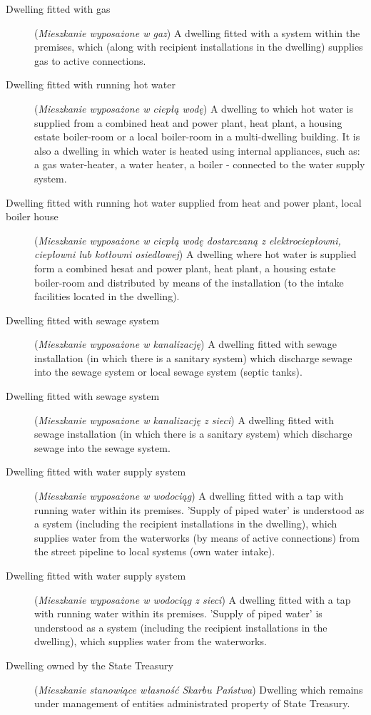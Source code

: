 \documentclass[12pt,a4paper]{article}
\begin{document}
\begin{description}
\item[Dwelling fitted with gas] (\textit{Mieszkanie wyposażone w gaz}) A dwelling fitted with a system within the premises, which (along with recipient installations in the dwelling) supplies gas to active connections.
\item[Dwelling fitted with running hot water] (\textit{Mieszkanie wyposażone w ciepłą wodę}) A dwelling to which hot water is supplied from a combined heat and power plant, heat plant, a housing estate boiler-room or a local boiler-room in a multi-dwelling building. It is also a dwelling in which water is heated using internal appliances, such as: a gas water-heater, a water heater, a boiler - connected to the water supply system.
\item[Dwelling fitted with running hot water supplied from heat and power plant, local boiler house] (\textit{Mieszkanie wyposażone w ciepłą wodę dostarczaną z elektrociepłowni, ciepłowni  lub kotłowni osiedlowej}) A dwelling where hot water is supplied form a combined hesat and power plant, heat plant, a housing estate boiler-room and distributed by means of the installation (to the intake facilities located in the dwelling).
\item[Dwelling fitted with sewage system] (\textit{Mieszkanie wyposażone w kanalizację}) A dwelling fitted with sewage installation (in which there is a sanitary system) which discharge sewage into the sewage system or local sewage system (septic tanks).
\item[Dwelling fitted with sewage system] (\textit{Mieszkanie wyposażone w kanalizację z sieci}) A dwelling fitted with sewage installation (in which there is a sanitary system) which discharge sewage into the sewage system.
\item[Dwelling fitted with water supply system] (\textit{Mieszkanie wyposażone w wodociąg}) A dwelling fitted with a tap with running water within its premises. 'Supply of piped water' is understood as a system (including the recipient installations in the dwelling), which supplies water from the waterworks (by means of active connections) from the street pipeline to local systems (own water intake).
\item[Dwelling fitted with water supply system] (\textit{Mieszkanie wyposażone w wodociąg z sieci}) A dwelling fitted with a tap with running water within its premises. 'Supply of piped water' is understood as a system (including the recipient installations in the dwelling), which supplies water from the waterworks.
\item[Dwelling owned by the State Treasury] (\textit{Mieszkanie stanowiące własność Skarbu Państwa}) Dwelling which remains under management of entities administrated property of State Treasury. 

\end{description}
\end{document}
